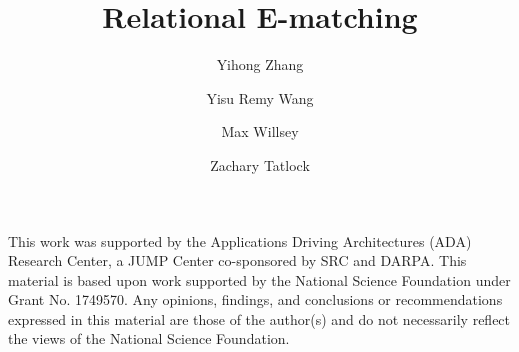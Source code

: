 \documentclass[acmsmall,screen,authorversion,nonacm]{acmart}
\author{Yihong Zhang}
\affiliation{
  \institution{University of Washington}
 \country{USA}
}
\author{Yisu Remy Wang}
\affiliation{
  \institution{University of Washington}
 \country{USA}
}
\author{Max Willsey}
\affiliation{
  \institution{University of Washington}
 \country{USA}
}
\author{Zachary Tatlock}
\affiliation{
  \institution{University of Washington}
  \country{USA}
}
\begin{document}
\title{Relational E-matching}

\begin{abstract}
  
\end{abstract}


\maketitle







% 


\begin{acks}
This work was supported by the Applications Driving Architectures (ADA)
Research Center, a JUMP Center co-sponsored by SRC and DARPA. This material is based upon work supported by the National Science Foundation
under Grant No. 1749570. Any opinions, findings, and conclusions or recommendations expressed in this
material are those of the author(s) and do not necessarily reflect the views of
the National Science Foundation.
\end{acks}



\end{document}
